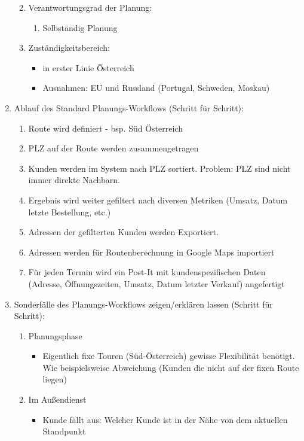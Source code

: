 \documentclass[Bachelorarbeit.tex]{subfiles}
\begin{document}
\begin{enumerate}
\begin{enumerate}
\begin{itemize}
		\end{itemize}
		\item Verantwortungsgrad der Planung:
		\begin{enumerate}
			\item[] Selbständig Planung
		\end{enumerate}
		\item Zuständigkeitsbereich:
		\begin{itemize}
			\item in erster Linie Österreich 
			\item Ausnahmen: EU und Russland  (Portugal, Schweden,  Moskau)
		\end{itemize}
	\end{enumerate}
	\item Ablauf des Standard Planungs-Workflows (Schritt für Schritt):
	\begin{enumerate}
		\item Route wird definiert - bsp. Süd Österreich
		\item PLZ auf der Route werden zusammengetragen
		\item Kunden werden im System nach PLZ sortiert. Problem: PLZ sind nicht immer direkte Nachbarn.
		\item Ergebnis wird weiter gefiltert nach diversen Metriken (Umsatz, Datum letzte Bestellung, etc.)
		\item Adressen der gefilterten Kunden werden Exportiert.
		\item Adressen werden für Routenberechnung in Google Maps importiert
		\item Für jeden Termin wird ein Post-It mit kundenspezifischen Daten (Adresse, Öffnungszeiten, Umsatz, Datum letzter Verkauf) angefertigt
	\end{enumerate}
	\item Sonderfälle des Planungs-Workflows zeigen/erklären lassen (Schritt für Schritt):
	\begin{enumerate}
		\item Planungsphase
		\begin{itemize}
			\item Eigentlich fixe Touren (Süd-Österreich) gewisse Flexibilität benötigt. Wie beispielsweise Abweichung (Kunden die nicht auf der fixen Route liegen) 
		\end{itemize}
		\item Im Außendienst
		\begin{itemize}
			\item Kunde fällt aus: Welcher Kunde ist in der Nähe von dem aktuellen Standpunkt

\end{itemize}
\end{enumerate}
\end{enumerate}
\end{document}
